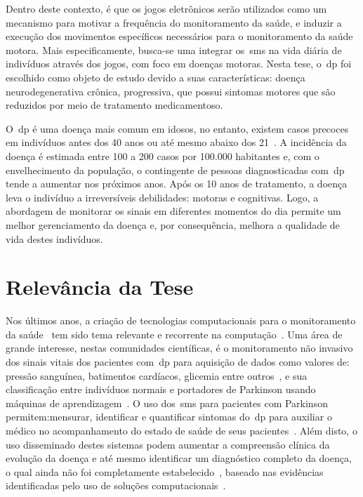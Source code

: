 Dentro deste contexto, é que os jogos eletrônicos serão utilizados como um mecanismo para motivar a frequência do monitoramento da saúde, e induzir a execução dos movimentos específicos necessários para o monitoramento da saúde motora. Mais especificamente, busca-se uma integrar os~\ac{sms} na vida diária de indivíduos através dos jogos, com foco em doenças motoras. Nesta tese, o~\ac{dp} foi escolhido como objeto de estudo devido a suas características: doença neurodegenerativa crônica, progressiva, que possui sintomas motores que são reduzidos por meio de tratamento medicamentoso. 

O~\ac{dp} é uma doença mais comum em idosos, no entanto, existem casos precoces em indivíduos antes dos 40 anos ou até mesmo abaixo dos 21~\cite{menezes2003}. A incidência da doença é estimada entre 100 a 200 casos por 100.000 habitantes e, com o envelhecimento da população, o contingente de pessoas diagnosticadas com~\ac{dp} tende a aumentar nos próximos anos. Após os 10 anos de tratamento, a doença leva o indivíduo a irreversíveis debilidades: motoras e cognitivas. Logo, a abordagem de monitorar os sinais em diferentes momentos do dia permite um melhor gerenciamento da doença e, por consequência, melhora a qualidade de vida destes indivíduos.


\section{Relevância da Tese}\label{section:relevancia}
Nos últimos anos, a criação de tecnologias computacionais para o monitoramento da saúde~\cite{bardram2008} tem sido tema relevante e recorrente na computação~\cite{bradmonitor2015,compapproachparkinson2015,mazilu2015}. Uma área de grande interesse, nestas comunidades científicas, é o monitoramento não invasivo dos sinais vitais dos pacientes com~\ac{dp} para aquisição de dados como valores de: pressão sanguínea, batimentos cardíacos, glicemia entre outros~\cite{autonomparkin2015,bloodparkinsonsonivansive2015,bloodnoninvasiveparkinson2013}, e sua classificação entre indivíduos normais e portadores de Parkinson usando máquinas de aprendizagem~\cite{compapproachparkinson2015}. O uso dos~\ac{sms} para pacientes com Parkinson permitem:mensurar, identificar e quantificar sintomas do~\ac{dp} para auxiliar o médico no acompanhamento do estado de saúde de seus pacientes~\cite{bradmonitor2015}. Além disto, o uso disseminado destes sistemas podem aumentar a compreensão clínica da evolução da doença e até mesmo identificar um diagnóstico completo da doença, o qual ainda não foi completamente estabelecido~\cite{parkinsondiag2015}, baseado nas evidências identificadas pelo uso de soluções computacionais~\cite{compapproachparkinson2015}. 


